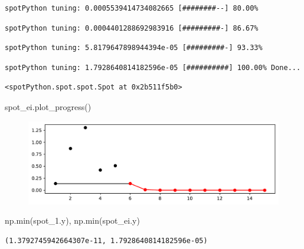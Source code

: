 \documentclass[
  letterpaper,
  DIV=11,
  numbers=noendperiod]{scrreprt}
\newenvironment{Shaded}{\begin{snugshade}}{\end{snugshade}}
\newcommand{\BuiltInTok}[1]{\textcolor[rgb]{0.00,0.23,0.31}{#1}}
\newcommand{\NormalTok}[1]{\textcolor[rgb]{0.00,0.23,0.31}{#1}}
\begin{document}
\begin{verbatim}
spotPython tuning: 0.0005539414734082665 [########--] 80.00% 
\end{verbatim}

\begin{verbatim}
spotPython tuning: 0.0004401288692983916 [#########-] 86.67% 
\end{verbatim}

\begin{verbatim}
spotPython tuning: 5.8179647898944394e-05 [#########-] 93.33% 
\end{verbatim}

\begin{verbatim}
spotPython tuning: 1.7928640814182596e-05 [##########] 100.00% Done...
\end{verbatim}

\begin{verbatim}
<spotPython.spot.spot.Spot at 0x2b511f5b0>
\end{verbatim}

\begin{Shaded}
\begin{Highlighting}[]
\NormalTok{spot\_ei.plot\_progress()}
\end{Highlighting}
\end{Shaded}

\begin{figure}[H]

{\centering \includegraphics{07_spot_ei_files/figure-pdf/cell-19-output-1.pdf}

}

\end{figure}

\begin{Shaded}
\begin{Highlighting}[]
\NormalTok{np.}\BuiltInTok{min}\NormalTok{(spot\_1.y), np.}\BuiltInTok{min}\NormalTok{(spot\_ei.y)}
\end{Highlighting}
\end{Shaded}

\begin{verbatim}
(1.3792745942664307e-11, 1.7928640814182596e-05)
\end{verbatim}
\end{document}
